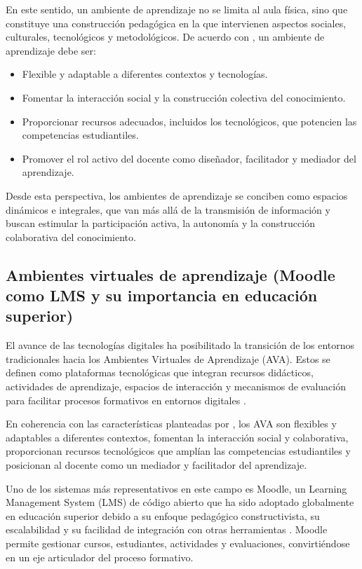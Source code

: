 \documentclass[letter,oneside,12pt,spanish]{report}
\begin{document}
En este sentido, un ambiente de aprendizaje no se limita al aula física, sino que constituye una construcción pedagógica en la que intervienen aspectos sociales, culturales, tecnológicos y metodológicos. De acuerdo con \textcite{castro2019}, un ambiente de aprendizaje debe ser:

\begin{itemize}
	\item Flexible y adaptable a diferentes contextos y tecnologías.
	\item Fomentar la interacción social y la construcción colectiva del conocimiento.
	\item Proporcionar recursos adecuados, incluidos los tecnológicos, que potencien las competencias estudiantiles.
	\item Promover el rol activo del docente como diseñador, facilitador y mediador del aprendizaje.
\end{itemize}

Desde esta perspectiva, los ambientes de aprendizaje se conciben como espacios dinámicos e integrales, que van más allá de la transmisión de información y buscan estimular la participación activa, la autonomía y la construcción colaborativa del conocimiento.

\subsection{Ambientes virtuales de aprendizaje (Moodle como LMS y su importancia en educación superior)}

El avance de las tecnologías digitales ha posibilitado la transición de los entornos tradicionales hacia los Ambientes Virtuales de Aprendizaje (AVA). Estos se definen como plataformas tecnológicas que integran recursos didácticos, actividades de aprendizaje, espacios de interacción y mecanismos de evaluación para facilitar procesos formativos en entornos digitales \parencite{salinas2004}.

En coherencia con las características planteadas por \textcite{castro2019}, los AVA son flexibles y adaptables a diferentes contextos, fomentan la interacción social y colaborativa, proporcionan recursos tecnológicos que amplían las competencias estudiantiles y posicionan al docente como un mediador y facilitador del aprendizaje.

Uno de los sistemas más representativos en este campo es Moodle, un Learning Management System (LMS) de código abierto que ha sido adoptado globalmente en educación superior debido a su enfoque pedagógico constructivista, su escalabilidad y su facilidad de integración con otras herramientas \parencite{dougiamas2003}. Moodle permite gestionar cursos, estudiantes, actividades y evaluaciones, convirtiéndose en un eje articulador del proceso formativo.
\end{document}

